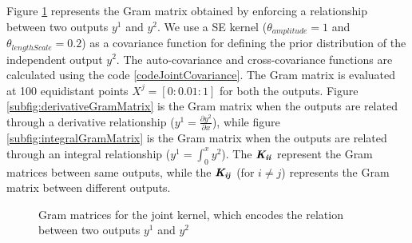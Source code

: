 Figure \ref{figGramMatricesJointKernel} represents the Gram matrix obtained by enforcing a relationship between two outputs $y^1$ and $y^2$. We use a SE kernel ($\theta_{amplitude} = 1$ and $\theta_{lengthScale} = 0.2$) as a covariance function for defining the prior distribution of the independent output $y^2$. The auto-covariance and cross-covariance functions are calculated using the code \ref{codeJointCovariance}. The Gram matrix is evaluated at 100 equidistant points $X^j = [0:0.01:1]$ for both the outputs. Figure \ref{subfig:derivativeGramMatrix} is the Gram matrix when the outputs are related through a derivative relationship (\(y^1 = \frac{\partial y^2}{\partial x}\)), while figure \ref{subfig:integralGramMatrix} is the Gram matrix when the outputs are related through an integral relationship (\(y^1 = \int_{0}^{x} y^2\)). The $\bm{\mathit{K_{ii}}}$ represent the Gram matrices between same outputs, while the $\bm{\mathit{K_{ij}}}$ (for $i \neq j$) represents the Gram matrix between different outputs.

\begin{figure}[!ht]
  \centering
  \quad
  \caption{Gram matrices for the joint kernel, which encodes the relation between two outputs $y^1$ and $y^2$}
  \label{figGramMatricesJointKernel}
\end{figure}

